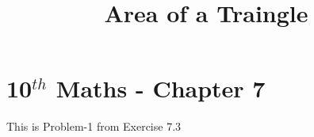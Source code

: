 \documentclass[12pt]{article}
\begin{document}
\begin{center}
\title{\textbf{Area of a Traingle}}
\date{\vspace{-5ex}} %
\maketitle
\end{center}

\setcounter{page}{1}



\section{10$^{th}$ Maths - Chapter 7}

This is Problem-1 from Exercise 7.3
\end{document}
